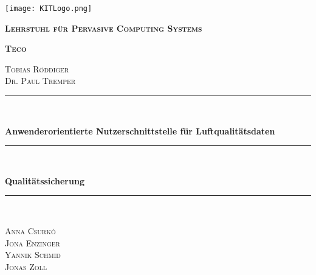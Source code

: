 \begin{titlepage}
    \centering
    \texttt{[image: KITLogo.png]}\par\vspace{1cm}
        {\scshape \bfseries Lehrstuhl für Pervasive Computing Systems\par}
        {\scshape \bfseries Teco\par}
        \vspace{0.25cm}
        {\scshape Tobias Röddiger\\Dr. Paul Tremper\par}
        \vspace{1.5cm}
  
      \newcommand{\HRule}{\rule{\linewidth}{0.5mm}}
      {\color{mintgreen}\HRule} \\[0.4cm]
        {\huge \bfseries \LARGE Anwenderorientierte Nutzerschnittstelle für Luftqualitätsdaten\par}
        {\color{mintgreen}\HRule} \\[0.4cm]
        {
            \huge \bfseries \LARGE Qualitätssicherung \par
        }
        {\color{mintgreen}\HRule} \\[1cm]
        \vspace{2cm}
        {\scshape \Large Anna Csurkó\\Jona Enzinger\\Yannik Schmid\\Jonas Zoll\par}
        \vfill
  
  \end{titlepage}
  
